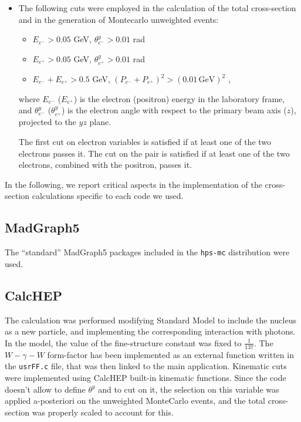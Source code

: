 \documentclass{article}
\begin{document}
\begin{itemize}
\item The following cuts were employed in the calculation of the total cross-section and in the generation of Montecarlo unweighted events:
\begin{itemize}
\item $E_{e^-} > 0.05$ GeV,  $\theta^y_{e^-} > 0.01$ rad
\item $E_{e^+} > 0.05$ GeV, $\theta^y_{e^+} > 0.01$ rad
\item $E_{e^-}+E_{e^+} > 0.5$ GeV, $(P_{e^-}+P_{e^+})^2 > (0.01 \, \mbox{GeV})^2$ \; \; ,
\end{itemize}
where $E_{e^-}$ ($E_{e^+}$) is the electron (positron) energy in the laboratory frame, and $\theta^y_{e^-}$ ($\theta^y_{e^+}$) is the electron angle with respect to the primary beam axis ($z$), projected to the $yz$ plane.

The first cut on electron variables is satisfied if at least one of the two electrons passes it. The cut on the pair is satisfied if at least one of the two electrons, combined with the positron, passes it.

\end{itemize}

In the following, we report critical aspects in the implementation of the cross-section calculations specific to each code we used.

\subsection{MadGraph5}

The ``standard'' MadGraph5 packages included in the \texttt{hps-mc} distribution were used. 

\subsection{CalcHEP}

The calculation was performed modifying Standard Model to include the nucleus as a new particle, and implementing the corresponding interaction with photons. In the model, the value of the fine-structure constant was fixed to $\frac{1}{137}$.
The $W-\gamma-W$ form-factor has been implemented as an external function written in the \texttt{usrFF.c} file, that was then linked to the main application. Kinematic cuts were implemented using CalcHEP built-in kinematic functions.
Since the code doesn't allow to define $\theta^y$ and to cut on it, the selection on this variable was applied a-posteriori on the unweighted MonteCarlo events, and the total cross-section was properly scaled to account for this.
\end{document}
